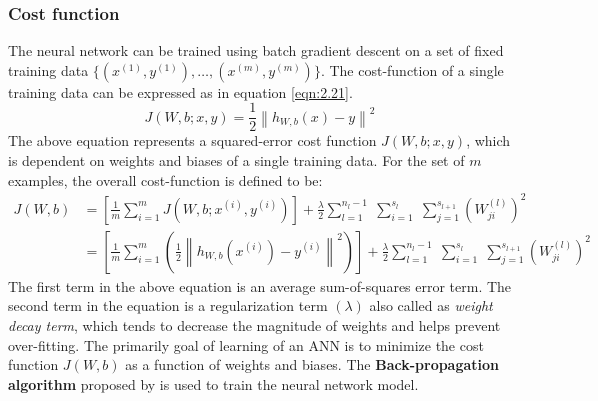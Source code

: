 \subsubsection{Cost function}
The neural network can be trained using batch gradient descent on a set of fixed training data $\{ (x^{(1)}, y^{(1)}), \ldots, (x^{(m)}, y^{(m)}) \}$. The cost-function of a single training data can be expressed as in equation \ref{eqn:2.21}.\\
 \begin{equation}\label{eqn:2.21}
 J(W,b; x,y) = \frac{1}{2} \left\| h_{W,b}(x) - y \right\|^2
 \end{equation}
The above equation represents a squared-error cost function $J(W,b; x,y)$, which is dependent on weights and biases of a single training data. For the set of $m$ examples, the overall cost-function is defined to be:\\
 \begin{align}
 J(W,b)
 &= \left[ \frac{1}{m} \sum_{i=1}^m J(W,b;x^{(i)},y^{(i)}) \right]
                       + \frac{\lambda}{2} \sum_{l=1}^{n_l-1} \; \sum_{i=1}^{s_l} \; \sum_{j=1}^{s_{l+1}} \left( W^{(l)}_{ji} \right)^2
 \\
&= \left[ \frac{1}{m} \sum_{i=1}^m \left( \frac{1}{2} \left\| h_{W,b}(x^{(i)}) - y^{(i)} \right\|^2 \right) \right]
                       + \frac{\lambda}{2} \sum_{l=1}^{n_l-1} \; \sum_{i=1}^{s_l} \; \sum_{j=1}^{s_{l+1}} \left( W^{(l)}_{ji} \right)^2
 \end{align}
The first term in the above equation is an average sum-of-squares error term. The second term in the equation is a regularization term $\left(\lambda\right)$ also called as \textit{weight decay term}, which tends to decrease the magnitude of weights and helps prevent over-fitting. The primarily goal of learning of an ANN is to minimize the cost function $J(W,b)$ as a function of weights and biases. The \textbf{Back-propagation algorithm} proposed by \citet{rumelhart1986learning} is used to train the neural network model.
